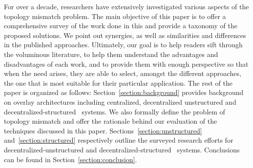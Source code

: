 For over a decade, researchers have extensively investigated  
various aspects of the topology mismatch problem.
The main objective of this paper is to offer a comprehensive 
survey of the work done in this and provide a
taxonomy of the proposed solutions. We point out synergies, as well as
similarities and differences in the published approaches. 
Ultimately, our goal is to help readers sift through 
the voluminous literature, to help them
understand the advantages and disadvantages of each work, and 
to provide them with enough perspective so that 
when the need arises, they are able to
select, amongst the different approaches, the one that is most suitable for
their particular application.
The rest of the paper is organized as follows: 
Section~\ref{section:background} provides background on
overlay architectures including centralized, decentralized
unstructured and decentralized-structured \p\ systems. 
We also formally define the problem of topology mismatch 
and offer the rationale behind our 
evaluation of the techniques discussed in this paper. 
Sections~\ref{section:unstructured} and~\ref{section:structured}
respectively outline the surveyed research efforts 
for decentralized-unstructured and decentralized-structured \p\ systems.
Conclusions can be found in Section~\ref{section:conclusion}.

